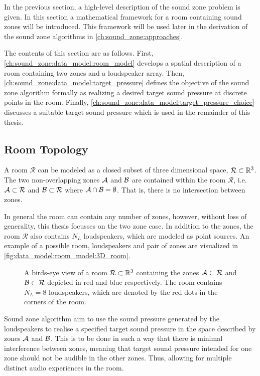 In the previous section, a high-level description of the sound zone problem is given.
In this section a mathematical framework for a room containing sound zones will be introduced.
This framework will be used later in the derivation of the sound zone algorithms in \autoref{ch:sound_zone:approaches}.

The contents of this section are as follows.
First, \autoref{ch:sound_zone:data_model:room_model} develops a spatial description of a room containing
two zones and a loudspeaker array.
Then, \autoref{ch:sound_zone:data_model:target_pressure} defines the objective of the sound zone algorithm formally
as realizing a desired target sound pressure at discrete points in the room.
Finally, \autoref{ch:sound_zone:data_model:target_pressure_choice} discusses a suitable target
sound pressure which is used in the remainder of this thesis.

\subsection{Room Topology}
\label{ch:sound_zone:data_model:room_model}
A room $\mathcal{R}$ can be modeled as a closed subset of three dimensional space, $\mathcal{R} \subset \mathbb{R}^{3}$.
The two non-overlapping zones $\mathcal{A}$ and $\mathcal{B}$ are contained within the room $\mathcal{R}$, 
i.e. $\mathcal{A} \subset \mathcal{R}$ and $\mathcal{B} \subset \mathcal{R}$ where $\mathcal{A} \cap \mathcal{B} = \emptyset$.
That is, there is no intersection between zones.

In general the room can contain any number of zones, however, without loss of generality, 
this thesis focusses on the two zone case. 
In addition to the zones, the room $\mathcal{R}$ also contains $N_L$ loudspeakers, which are modeled as point sources.
An example of a possible room, loudspeakers and pair of zones are visualized in \autoref{fig:data_model:room_model:3D_room}.

\begin{figure}
    \centering
    
    \caption{A birds-eye view of a room $\mathcal{R}\subset \mathbb{R}^{3}$ containing the zones $\mathcal{A}\subset\mathcal{R}$ 
    and $\mathcal{B}\subset\mathcal{R}$ depicted in red and blue respectively. 
    The room contains $N_L = 8$ loudspeakers, which are denoted by the red dots in the corners of the room.}
    \label{fig:data_model:room_model:3D_room}
\end{figure}

Sound zone algorithm aim to use the sound pressure generated by the loudspeakers to realise a specified target sound pressure
in the space described by zones $\mathcal{A}$ and $\mathcal{B}$.
This is to be done in such a way that there is minimal interference between zones, 
meaning that target sound pressure intended for one zone should not be audible in the other zones.
Thus, allowing for multiple distinct audio experiences in the room.

